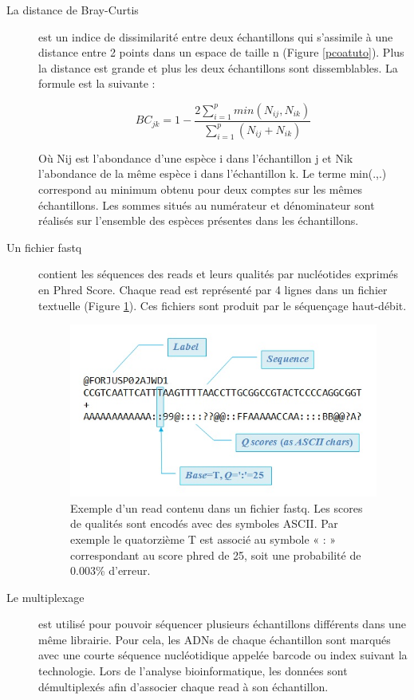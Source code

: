 \documentclass[12pt,a4paper]{article}
\begin{document}
\begin{description}
\item[La distance de Bray-Curtis] est un indice de dissimilarité entre deux échantillons qui s'assimile à une distance entre 2 points dans un espace de taille n (Figure \ref{pcoatuto}). Plus la distance est grande et plus les deux échantillons sont dissemblables. La formule est la suivante : 

\begin{mycapequ}[!h]
   \begin{equation}
    BC_{jk} = 1 - \frac{2\sum_{i=1}^{p}min(N_{ij},N_{ik})}{\sum_{i=1}^{p}(N_{ij} + N_{ik})} 
   \end{equation}
      \caption{Où Nij est l'abondance d'une  espèce i dans l'échantillon j et Nik l'abondance de la même espèce i dans l'échantillon k. Le terme min(.,.) correspond au minimum obtenu pour deux comptes sur les mêmes échantillons. Les sommes situés au numérateur et dénominateur sont réalisés sur l'ensemble des espèces présentes dans les échantillons.}
\end{mycapequ}


\item[Un fichier fastq] contient les séquences des reads et leurs qualités par nucléotides exprimés en Phred Score. Chaque read est représenté par 4 lignes dans un fichier textuelle (Figure \ref{fastq}). Ces fichiers sont produit par le séquençage haut-débit. 

\begin{figure}[!h]
\begin{center}
\includegraphics[scale=0.6]{img/fastq.jpg}\hfill
\end{center}
\caption{Exemple d'un read contenu dans un fichier fastq. Les scores de qualités sont encodés avec des symboles ASCII. Par exemple le quatorzième T  est associé au symbole « : » correspondant au score phred de 25, soit une probabilité de 0.003\% d'erreur.  }
\label{fastq}
\end{figure}

\item[Le multiplexage] est utilisé pour pouvoir séquencer plusieurs échantillons différents dans une même librairie. Pour cela, les ADNs de chaque échantillon sont marqués avec une courte séquence nucléotidique appelée barcode ou index suivant la technologie. Lors de l'analyse bioinformatique, les données sont démultiplexés afin d'associer chaque read à son échantillon. 

\end{description}
\end{document}
